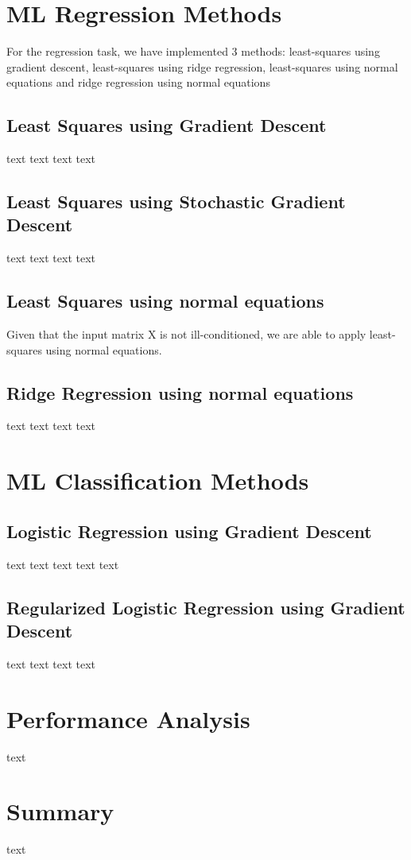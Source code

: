 \documentclass[10pt,conference,compsocconf]{IEEEtran}
\begin{document}
\section{ML Regression Methods}
For the regression task, we have implemented 3 methods:
least-squares using gradient descent,
least-squares using ridge regression,
least-squares using normal equations and
ridge regression using normal equations
\subsection{Least Squares using Gradient Descent}
text text text text 
\subsection{Least Squares using Stochastic Gradient Descent}
text text text text 
\subsection{Least Squares using normal equations}
Given that the input matrix X is not ill-conditioned, we are able to apply
least-squares using normal equations.
\subsection{Ridge Regression using normal equations}
text text text text 

\section{ML Classification Methods}
\subsection{Logistic Regression using Gradient Descent}
text text text text text 
\subsection{Regularized Logistic Regression using Gradient Descent}
text text text text


\section{Performance Analysis}
text 

\section{Summary}
text

%
%
\end{document}
